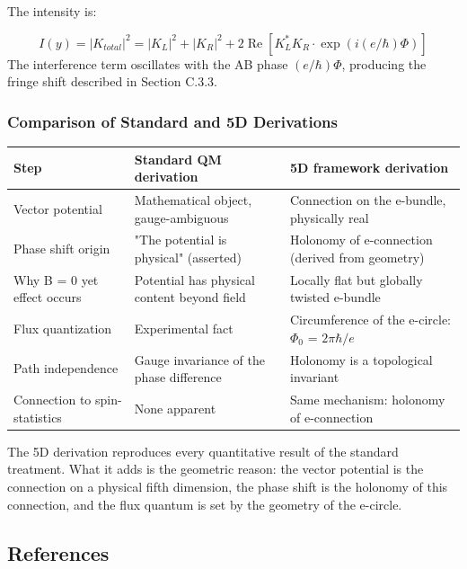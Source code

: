 \documentclass[aps,prd,preprint,superscriptaddress,longbibliography,floatfix]{revtex4-2}
\theoremstyle{remark}
\begin{document}
The intensity is:


\begin{equation}
    I(y) = |K_{total}|^{2} = |K_L|^{2} + |K_R|^{2} + 2\operatorname{Re}[K_L^* K_R \cdot \exp(i(e/\hbar)\Phi)]
\end{equation}
The interference term oscillates with the AB phase $(e/\hbar)\Phi$, producing the fringe shift described in Section C.3.3.


\subsubsection{Comparison of Standard and 5D Derivations}


\begin{table}[H]
\begin{ruledtabular}
\begin{tabular}{p{5.0cm}p{5.0cm}p{5.0cm}}
Step & Standard QM derivation & 5D framework derivation \\
\hline
Vector potential & Mathematical object, gauge-ambiguous & Connection on the e-bundle, physically real \\
Phase shift origin & "The potential is physical" (asserted) & Holonomy of e-connection (derived from geometry) \\
Why B = 0 yet effect occurs & Potential has physical content beyond field & Locally flat but globally twisted e-bundle \\
Flux quantization & Experimental fact & Circumference of the e-circle: $\Phi_{0}$ = $2\pi\hbar/e$ \\
Path independence & Gauge invariance of the phase difference & Holonomy is a topological invariant \\
Connection to spin-statistics & None apparent & Same mechanism: holonomy of e-connection \\
\end{tabular}
\end{ruledtabular}
\end{table}

The 5D derivation reproduces every quantitative result of the standard treatment. What it adds is the geometric reason: the vector potential is the connection on a physical fifth dimension, the phase shift is the holonomy of this connection, and the flux quantum is set by the geometry of the e-circle.



\subsection{References}
\end{document}
